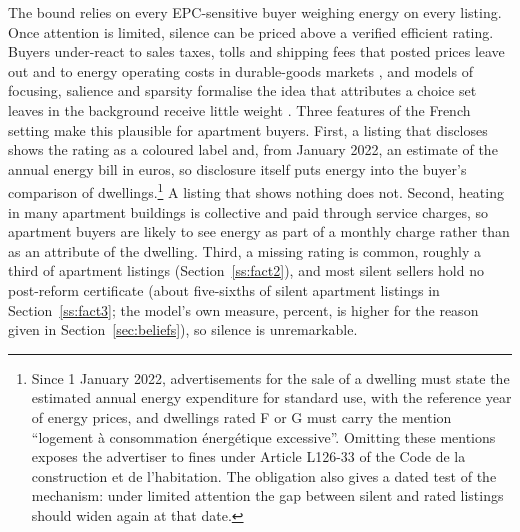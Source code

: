The bound relies on every EPC-sensitive buyer weighing energy on every listing. Once attention is limited, silence can be priced above a verified efficient rating. Buyers under-react to sales taxes, tolls and shipping fees that posted prices leave out \citep{chetty_salience_2009, finkelstein_eztax_2009, brown_shrouded_2010} and to energy operating costs in durable-goods markets \citep[e.g.,][]{allcott_consumers_2011, sallee_rational_2014}, and models of focusing, salience and sparsity formalise the idea that attributes a choice set leaves in the background receive little weight \citep[e.g.,][]{koszegi_model_2013, bordalo_salience_2013, gabaix_sparsity_2014}. Three features of the French setting make this plausible for apartment buyers. First, a listing that discloses shows the rating as a coloured label and, from January 2022, an estimate of the annual energy bill in euros, so disclosure itself puts energy into the buyer's comparison of dwellings.\footnote{Since 1 January 2022, advertisements for the sale of a dwelling must state the estimated annual energy expenditure for standard use, with the reference year of energy prices, and dwellings rated F or G must carry the mention ``logement \`a consommation \'energ\'etique excessive''. Omitting these mentions exposes the advertiser to fines under Article L126-33 of the Code de la construction et de l'habitation. %
The obligation also gives a dated test of the mechanism: under limited attention the gap between silent and rated listings should widen again at that date.} A listing that shows nothing does not. Second, heating in many apartment buildings is collective and paid through service charges, so apartment buyers are likely to see energy as part of a monthly charge rather than as an attribute of the dwelling. Third, a missing rating is common, roughly a third of apartment listings (Section~\ref{ss:fact2}), and most silent sellers hold no post-reform certificate (about five-sixths of silent apartment listings in Section~\ref{ss:fact3}; the model's own measure, \attShareUninfApt{} percent, is higher for the reason given in Section~\ref{sec:beliefs}), so silence is unremarkable.

